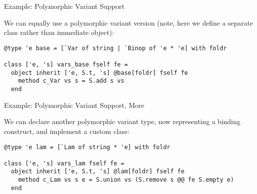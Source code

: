 \documentclass{beamer}
\theoremstyle{definition}
\theoremstyle{plain} %
\begin{document}
\begin{frame}[fragile]{Example: Polymorphic Variant Support}

  We can equally use a polymorphic variant version (note, here we define a separate class rather than immediate object):
  \vskip5mm
  
\begin{lstlisting}
@type 'e base = [`Var of string | `Binop of 'e * 'e] with foldr

class ['e, 's] vars_base fself fe =
  object inherit ['e, S.t, 's] @base[foldr] fself fe 
    method c_Var vs s = S.add s vs
  end
\end{lstlisting}

\end{frame}


\begin{comment}
  The next step, another polymorphic variant type, this time for a binding construct. Nothing specifically interesting
  here, just reiteration of the same pattern. 
\end{comment}

\begin{frame}[fragile]{Example: Polymorphic Variant Support, More}

  We can declare another polymorphic variant type, now representing a binding construct,
  and implement a custom class:
  \vskip5mm
  
\begin{lstlisting}
@type 'e lam = [`Lam of string * 'e] with foldr

class ['e, 's] vars_lam fself fe =
  object inherit ['e, S.t, 's] @lam[foldr] fself fe
    method c_Lam vs s e = S.union vs (S.remove s @@ fe S.empty e)
  end
\end{lstlisting}
\end{frame}


\begin{comment}
  We can combine the two types into one (no surprise, just the best practices from OCaml world), but we can also
  combine the transformations in a purely declarative manner using the inheritance. Note, that the instantiation
  of the type parameter to the same type is done only within the definition of \lstinline|vars|, i.e. in the
  latest possible moment. The type itself remains polymorphic (= openly recursive), as well as the transformation,
  and can be extended further.
\end{comment}
\end{document}
